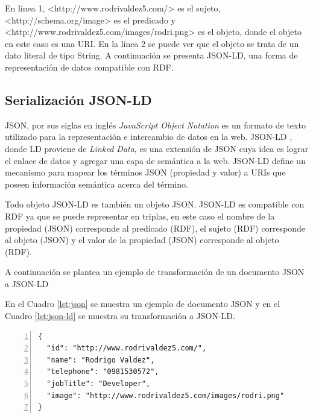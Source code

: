 En linea 1, <http://www.rodrivaldez5.com/> es el sujeto, <http://schema.org/image>  es el predicado y <http://www.rodrivaldez5.com/images/rodri.png>  es el objeto, donde el objeto en este caso es una URI. En la línea 2 se puede ver que el objeto se trata de un dato literal de tipo String.  A continuación se presenta JSON-LD, una forma de representación de datos compatible con RDF.

\subsection{Serialización JSON-LD}

JSON, por sus siglas en inglés \textit{JavaScript Object Notation} es un formato de texto utilizado para la representación e intercambio de datos en la web. JSON-LD \cite{JSONLDSy39:online}, donde LD proviene de \textit{Linked Data}, es una extensión de JSON cuya idea es lograr el enlace de datos y agregar una capa de semántica a la web. JSON-LD define un mecanismo para mapear los términos JSON (propiedad y valor) a URIs que poseen información semántica acerca del término. 

Todo objeto JSON-LD es también un objeto JSON. JSON-LD es compatible con RDF ya que se puede representar en triplas, en este caso el nombre de la propiedad (JSON) corresponde al predicado (RDF), el sujeto (RDF) corresponde al objeto (JSON) y el valor de la propiedad (JSON) corresponde al objeto (RDF).

A continuación se plantea un ejemplo de transformación de un documento JSON a JSON-LD 

En el Cuadro \ref{lst:json} se muestra un ejemplo de documento JSON y en el Cuadro \ref{lst:json-ld} se muestra su transformación a JSON-LD.  
\newline

\lstset{language=json}  

\noindent\begin{minipage}{\textwidth}
\begin{lstlisting}[captionpos=b, caption=Ejemplo de un documento JSON, label=lst:json,  numbers=left,  numberstyle=\tiny\color{mygray},frame=single]
{
  "id": "http://www.rodrivaldez5.com/",
  "name": "Rodrigo Valdez",
  "telephone": "0981530572",
  "jobTitle": "Developer",
  "image": "http://www.rodrivaldez5.com/images/rodri.png"
}
\end{lstlisting}
\end{minipage}

